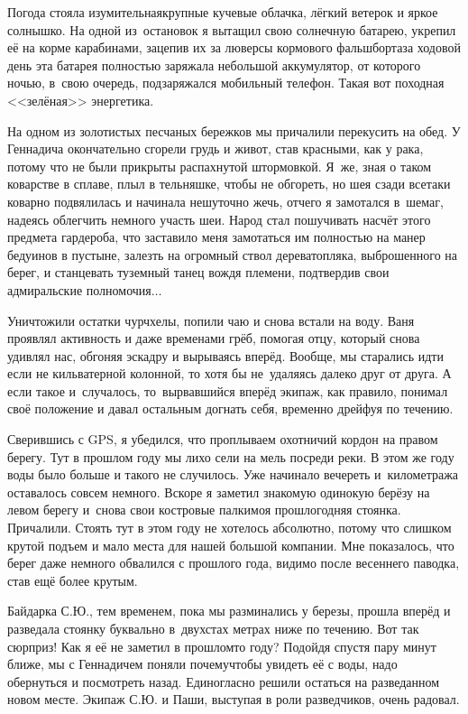 Погода стояла изумительная\mdash крупные кучевые облачка, лёгкий ветерок и яркое солнышко. На одной из~остановок я вытащил свою солнечную батарею, укрепил её на корме карабинами, зацепив их за люверсы кормового фальшборта\mdash за ходовой день эта батарея полностью заряжала небольшой аккумулятор, от которого ночью, в~свою очередь, подзаряжался мобильный телефон. Такая вот походная <<зелёная>> энергетика.

На одном из золотистых песчаных бережков мы причалили перекусить на обед. У Геннадича окончательно сгорели грудь и живот, став красными, как у рака, потому что не были прикрыты распахнутой штормовкой. Я~же, зная о таком коварстве в сплаве, плыл в тельняшке, чтобы не обгореть, но шея сзади все\sdash таки коварно подвялилась и начинала нешуточно жечь, отчего я замотался в~шемаг, надеясь облегчить немного участь шеи. Народ стал пошучивать насчёт этого предмета гардероба, что заставило меня замотаться им полностью на манер бедуинов в пустыне, залезть на огромный ствол дерева\sdash топляка, выброшенного на берег, и станцевать туземный танец вождя племени, подтвердив свои адмиральские полномочия$\ldots$

Уничтожили остатки чурчхелы, попили чаю и снова встали на воду. Ваня проявлял активность и даже временами грёб, помогая отцу, который снова удивлял нас, обгоняя эскадру и вырываясь вперёд. Вообще, мы старались идти если не кильватерной колонной, то хотя бы не~удаляясь далеко друг от друга. А если такое и~случалось, то~вырвавшийся вперёд экипаж, как правило, понимал своё положение и давал остальным догнать себя, временно дрейфуя по течению.

Сверившись с GPS, я убедился, что проплываем охотничий кордон на правом берегу. Тут в прошлом году мы лихо сели на мель посреди реки. В этом же году воды было больше и такого не случилось. Уже начинало вечереть и~километража оставалось совсем немного. Вскоре я заметил знакомую одинокую берёзу на левом берегу и~снова свои костровые палки\mdash моя прошлогодняя стоянка. Причалили. Стоять тут в этом году не хотелось абсолютно, потому что слишком крутой подъем и мало места для нашей большой компании. Мне показалось, что берег даже немного обвалился с прошлого года, видимо после весеннего паводка, став ещё более крутым.

Байдарка С.Ю., тем временем, пока мы разминались у березы, прошла вперёд и разведала стоянку буквально в~двухстах метрах ниже по течению. Вот так сюрприз! Как я её не заметил в прошлом\sdash то году? Подойдя спустя пару минут ближе, мы с Геннадичем поняли почему\mdash чтобы увидеть её с воды, надо обернуться и посмотреть назад. Единогласно решили остаться на разведанном новом месте. Экипаж С.Ю. и Паши, выступая в роли разведчиков, очень радовал. 

